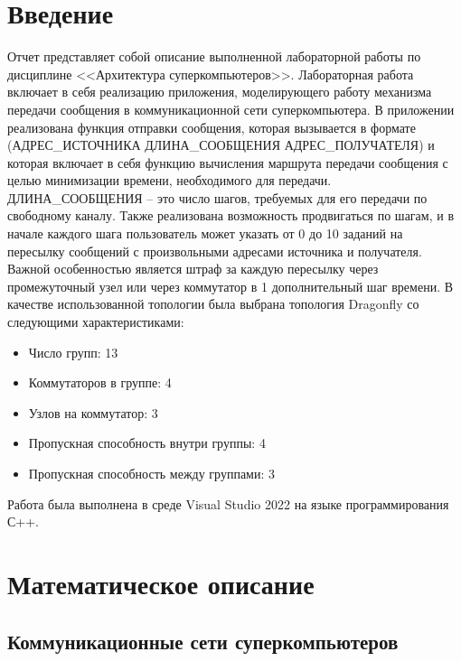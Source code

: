 \documentclass[11pt,a4paper,final]{article} %
\begin{document}
\newpage

\tableofcontents

\newpage
\section* {Введение}

\par Отчет представляет собой описание выполненной лабораторной работы по дисциплине <<Архитектура суперкомпьютеров>>. Лабораторная работа включает в себя реализацию приложения, моделирующего работу механизма передачи сообщения в коммуникационной сети суперкомпьютера. В приложении реализована функция отправки сообщения, которая вызывается в формате (АДРЕС\_ИСТОЧНИКА ДЛИНА\_СООБЩЕНИЯ АДРЕС\_ПОЛУЧАТЕЛЯ) и которая включает в себя функцию вычисления маршрута передачи сообщения с целью минимизации времени, необходимого для передачи. ДЛИНА\_СООБЩЕНИЯ -- это число шагов, требуемых для его передачи по свободному каналу. Также реализована возможность продвигаться по шагам, и в начале каждого шага пользователь может указать от 0 до 10 заданий на пересылку сообщений с произвольными адресами источника и получателя. Важной особенностью является штраф за каждую пересылку через промежуточный узел или через коммутатор в 1 дополнительный шаг времени. В качестве использованной топологии была выбрана топология Dragonfly со следующими характеристиками:
\begin{itemize}
	\item Число групп: 13
	\item Коммутаторов в группе: 4
	\item Узлов на коммутатор: 3
	\item Пропускная способность внутри группы: 4
	\item Пропускная способность между группами: 3
\end{itemize}



\par Работа была выполнена в среде Visual Studio 2022 на языке программирования С++.	
	

\newpage
\section {Математическое описание}

\subsection {Коммуникационные сети суперкомпьютеров} 
\end{document}
